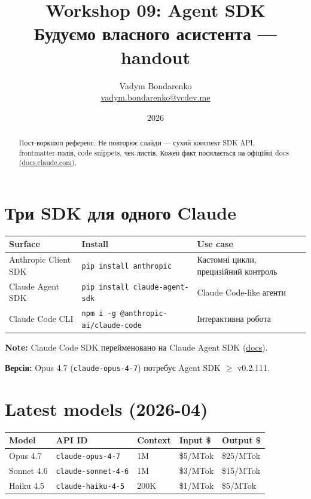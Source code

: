 \documentclass[11pt,a4paper]{article}
\title{%
  {\Huge\bfseries Workshop 09: Agent SDK}\\[0.6em]
  {\large Будуємо власного асистента --- handout}
}
\author{Vadym Bondarenko \\ \small\href{mailto:vadym.bondarenko@vcdev.me}{vadym.bondarenko@vcdev.me}}
\date{2026}
\begin{document}
\maketitle

\begin{abstract}
Пост-воркшоп референс. Не повторює слайди --- сухий конспект SDK API, frontmatter-полів, code snippets, чек-листів. Кожен факт посилається на офіційні docs (\href{https://docs.claude.com/en/api/getting-started}{docs.claude.com}).
\end{abstract}

\tableofcontents
\newpage

\section{Три SDK для одного Claude}

\begin{tabular}{lll}
\hline
\textbf{Surface} & \textbf{Install} & \textbf{Use case} \\
\hline
Anthropic Client SDK & \texttt{pip install anthropic} & Кастомні цикли, прецизійний контроль \\
Claude Agent SDK & \texttt{pip install claude-agent-sdk} & Claude Code-like агенти \\
Claude Code CLI & \texttt{npm i -g @anthropic-ai/claude-code} & Інтерактивна робота \\
\hline
\end{tabular}

\textbf{Note:} Claude Code SDK перейменовано на Claude Agent SDK (\href{https://docs.claude.com/en/agent-sdk/overview}{docs}).

\textbf{Версія:} Opus 4.7 (\texttt{claude-opus-4-7}) потребує Agent SDK $\ge$ v0.2.111.

\section{Latest models (2026-04)}

\begin{tabular}{lllll}
\hline
\textbf{Model} & \textbf{API ID} & \textbf{Context} & \textbf{Input \$} & \textbf{Output \$} \\
\hline
Opus 4.7 & \texttt{claude-opus-4-7} & 1M & \$5/MTok & \$25/MTok \\
Sonnet 4.6 & \texttt{claude-sonnet-4-6} & 1M & \$3/MTok & \$15/MTok \\
Haiku 4.5 & \texttt{claude-haiku-4-5} & 200K & \$1/MTok & \$5/MTok \\
\hline
\end{tabular}
\end{document}
